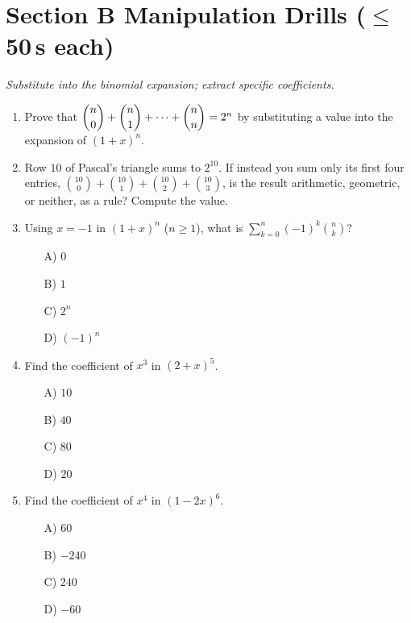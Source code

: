 \documentclass[11pt,a4paper]{article}
\begin{document}
\section*{Section B \quad Manipulation Drills \hfill{\normalfont\small($\leq$50\,s each)}}

\noindent\textit{Substitute into the binomial expansion; extract specific coefficients.}

\begin{enumerate}

\item Prove that $\dbinom n0+\dbinom n1+\cdots+\dbinom nn=2^n$ by substituting a value into the expansion of $(1+x)^n$.

\item Row $10$ of Pascal's triangle sums to $2^{10}$. If instead you sum only its first four entries, $\binom{10}{0}+\binom{10}{1}+\binom{10}{2}+\binom{10}{3}$, is the result arithmetic, geometric, or neither, as a rule? Compute the value.

\item Using $x=-1$ in $(1+x)^n$ ($n\geq1$), what is $\displaystyle\sum_{k=0}^n(-1)^k\binom nk$?
\begin{itemize}
\item[A)] $0$
\item[B)] $1$
\item[C)] $2^n$
\item[D)] $(-1)^n$
\end{itemize}

\item Find the coefficient of $x^3$ in $(2+x)^5$.
\begin{itemize}
\item[A)] $10$
\item[B)] $40$
\item[C)] $80$
\item[D)] $20$
\end{itemize}

\item Find the coefficient of $x^4$ in $(1-2x)^6$.
\begin{itemize}
\item[A)] $60$
\item[B)] $-240$
\item[C)] $240$
\item[D)] $-60$
\end{itemize}


\end{enumerate}
\end{document}
